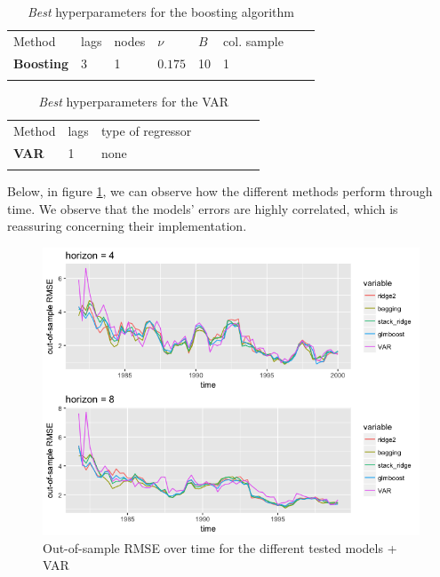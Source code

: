 \begin{table}[!htb]
\begin{center}
\caption{\textit{Best} hyperparameters for the boosting algorithm}
\label{tab:bestparamsbagrvfl}       %
\begin{tabular}{llllllll}
\hline\noalign{\smallskip}
Method & lags & nodes & $\nu$ & $B$ & col. sample  &  & \\
\noalign{\smallskip}\hline\noalign{\smallskip}
  \textbf{Boosting} & 3 & 1 & $0.175$ & 10 & 1 & & \\
\noalign{\smallskip}\hline
\end{tabular}
\end{center}
\end{table}

\begin{table}[!htb]
\begin{center}
\caption{\textit{Best} hyperparameters for the VAR}
\label{tab:bestparamsvar}       %
\begin{tabular}{llllllll}
\hline\noalign{\smallskip}
Method & lags & type of regressor &  &  &  &  & \\
\noalign{\smallskip}\hline\noalign{\smallskip}
  \textbf{VAR} & 1 & none &  & &  & & \\
\noalign{\smallskip}\hline
\end{tabular}
\end{center}
\end{table}

\newpage

Below, in figure \ref{oos_rmse_over_time}, we can observe how the different methods perform through time. We observe that the models' errors are highly correlated, which is reassuring concerning their implementation. 

\begin{figure}[!htb]
\centering
\includegraphics[width=14cm]{gfx/chapter-rvfl-ensembles/oos_rmse_over_time.png}
\caption{Out-of-sample RMSE over time for the different tested models + VAR}
\label{oos_rmse_over_time}
\end{figure}

